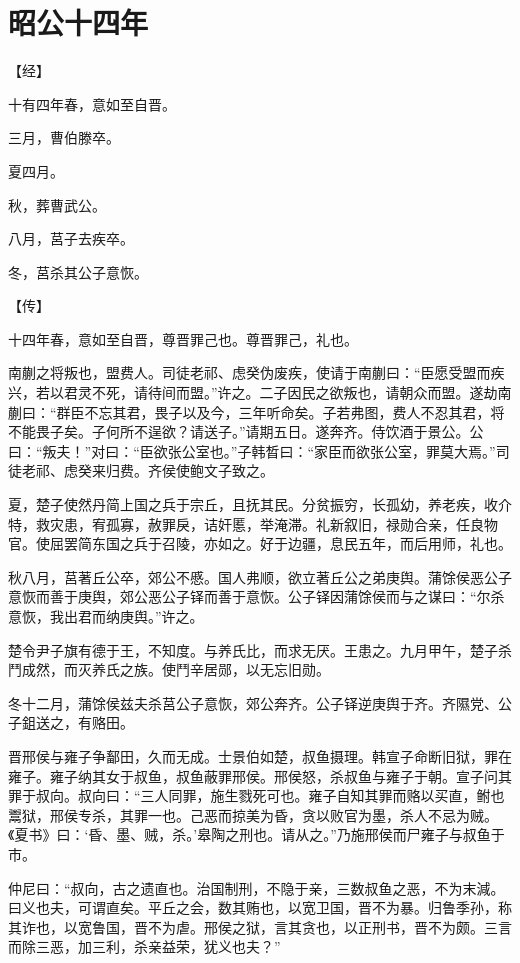 \documentclass[a4paper,12pt,UTF8,twoside]{ctexbook}
\begin{document}
\chapter{昭公十四年}



【经】

十有四年春，意如至自晋。

三月，曹伯滕卒。

夏四月。

秋，葬曹武公。

八月，莒子去疾卒。

冬，莒杀其公子意恢。

【传】

十四年春，意如至自晋，尊晋罪己也。尊晋罪己，礼也。

南蒯之将叛也，盟费人。司徒老祁、虑癸伪废疾，使请于南蒯曰：“臣愿受盟而疾兴，若以君灵不死，请待间而盟。”许之。二子因民之欲叛也，请朝众而盟。遂劫南蒯曰：“群臣不忘其君，畏子以及今，三年听命矣。子若弗图，费人不忍其君，将不能畏子矣。子何所不逞欲？请送子。”请期五日。遂奔齐。侍饮酒于景公。公曰：“叛夫！”对曰：“臣欲张公室也。”子韩晳曰：“家臣而欲张公室，罪莫大焉。”司徒老祁、虑癸来归费。齐侯使鲍文子致之。

夏，楚子使然丹简上国之兵于宗丘，且抚其民。分贫振穷，长孤幼，养老疾，收介特，救灾患，宥孤寡，赦罪戾，诘奸慝，举淹滞。礼新叙旧，禄勋合亲，任良物官。使屈罢简东国之兵于召陵，亦如之。好于边疆，息民五年，而后用师，礼也。

秋八月，莒著丘公卒，郊公不慼。国人弗顺，欲立著丘公之弟庚舆。蒲馀侯恶公子意恢而善于庚舆，郊公恶公子铎而善于意恢。公子铎因蒲馀侯而与之谋曰：“尔杀意恢，我出君而纳庚舆。”许之。

楚令尹子旗有德于王，不知度。与养氏比，而求无厌。王患之。九月甲午，楚子杀鬥成然，而灭养氏之族。使鬥辛居郧，以无忘旧勋。

冬十二月，蒲馀侯兹夫杀莒公子意恢，郊公奔齐。公子铎逆庚舆于齐。齐隰党、公子鉏送之，有赂田。

晋邢侯与雍子争鄐田，久而无成。士景伯如楚，叔鱼摄理。韩宣子命断旧狱，罪在雍子。雍子纳其女于叔鱼，叔鱼蔽罪邢侯。邢侯怒，杀叔鱼与雍子于朝。宣子问其罪于叔向。叔向曰：“三人同罪，施生戮死可也。雍子自知其罪而赂以买直，鲋也鬻狱，邢侯专杀，其罪一也。己恶而掠美为昏，贪以败官为墨，杀人不忌为贼。《夏书》曰：‘昏、墨、贼，杀。’皋陶之刑也。请从之。”乃施邢侯而尸雍子与叔鱼于市。

仲尼曰：“叔向，古之遗直也。治国制刑，不隐于亲，三数叔鱼之恶，不为末減。曰义也夫，可谓直矣。平丘之会，数其贿也，以宽卫国，晋不为暴。归鲁季孙，称其诈也，以宽鲁国，晋不为虐。邢侯之狱，言其贪也，以正刑书，晋不为颇。三言而除三恶，加三利，杀亲益荣，犹义也夫？”
\end{document}
